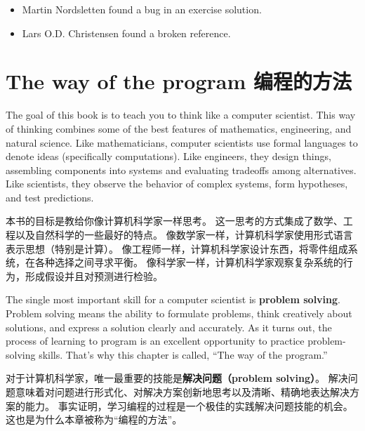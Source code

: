 \documentclass[10pt]{book}
\begin{document}
\begin{CJK}{UTF8}{gbsn}
\begin{itemize}
\item Martin Nordsletten found a bug in an exercise solution.

\item Lars O.D. Christensen found a broken reference.


\end{itemize}

\normalsize
\clearemptydoublepage

\begin{latexonly}

\tableofcontents

\clearemptydoublepage

\end{latexonly}

\mainmatter

\chapter{The way of the program 编程的方法}

The goal of this book is to teach you to think like a
computer scientist.  This way of thinking combines some of the best features
of mathematics, engineering, and natural science.  Like mathematicians,
computer scientists use formal languages to denote ideas (specifically
computations).  Like engineers, they design things, assembling components
into systems and evaluating tradeoffs among alternatives.  Like scientists,
they observe the behavior of complex systems, form hypotheses, and test
predictions.

本书的目标是教给你像计算机科学家一样思考。
这一思考的方式集成了数学、工程以及自然科学的一些最好的特点。
像数学家一样，计算机科学家使用形式语言表示思想（特别是计算）。
像工程师一样，计算机科学家设计东西，将零件组成系统，在各种选择之间寻求平衡。
像科学家一样，计算机科学家观察复杂系统的行为，形成假设并且对预测进行检验。

The single most important skill for a computer scientist is {\bf
problem solving}.  Problem solving means the ability to formulate
problems, think creatively about solutions, and express a solution clearly
and accurately.  As it turns out, the process of learning to program is an
excellent opportunity to practice problem-solving skills.  That's why
this chapter is called, ``The way of the program.''

对于计算机科学家，唯一最重要的技能是{\bf 解决问题（problem solving）}。
解决问题意味着对问题进行形式化、对解决方案创新地思考以及清晰、精确地表达解决方案的能力。
事实证明，学习编程的过程是一个极佳的实践解决问题技能的机会。
这也是为什么本章被称为``编程的方法''。


\end{CJK}
\end{document}
